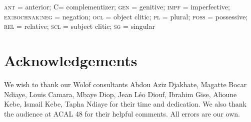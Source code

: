 \documentclass[output=paper]{langsci/langsci}
\begin{document}
\textsc{ant} = anterior; C= complementizer; \textsc{gen} = genitive; \textsc{impf} = imperfective; \textsc{ex:bochnak:neg} =
negation; \textsc{ocl} = object clitic; \textsc{pl} = plural; \textsc{poss} = possessive;
\textsc{rel} = relative; \textsc{scl} = subject clitic; \textsc{sg} = singular


\section*{Acknowledgements}

We wish to thank our Wolof consultants Abdou Aziz Djakhate, Magatte Bocar Ndiaye, Louis Camara, Mbaye
Diop, Jean L\'eo Diouf, Ibrahim Gise,  Alioune Kebe, Ismail Kebe,
Tapha Ndiaye for their time and dedication. We also thank the audience
at ACAL 48 for their helpful comments. All errors are our own.  

\sloppy
\printbibliography[heading=subbibliography,notkeyword=this]
\end{document}
